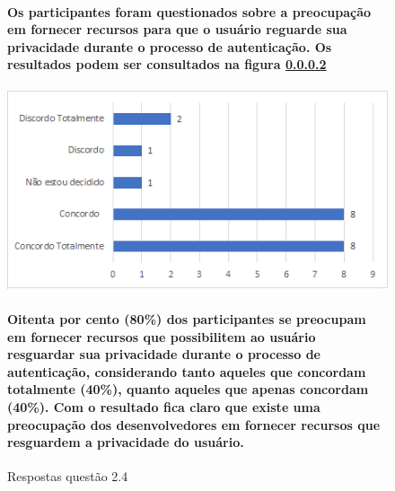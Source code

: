 \begin{figure}[!t]
\centering
\paragraph{
Os participantes foram questionados sobre a preocupação em fornecer recursos para que o usuário reguarde sua privacidade durante o processo de autenticação. Os resultados podem ser consultados na figura \ref{fig:2.4}
}

\includegraphics[scale=0.7]{figuras das questoes/2.4.png}
\caption{Respostas questão 2.4}

\paragraph{
Oitenta por cento (80{\%}) dos participantes se preocupam em fornecer recursos que possibilitem ao usuário resguardar sua privacidade durante o processo de autenticação, considerando tanto aqueles que concordam totalmente (40{\%}), quanto aqueles que apenas concordam (40{\%}). Com o resultado fica claro que existe uma preocupação dos desenvolvedores em fornecer recursos que resguardem a privacidade do usuário.
}

\label{fig:2.4}
\end{figure}
